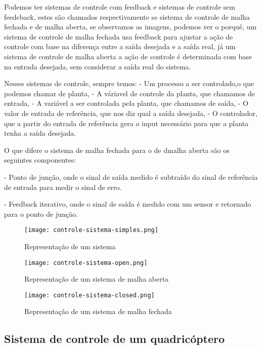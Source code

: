 Podemos ter sistemas de controle com feedback e sistemas de controle sem feedeback, estes são chamados respectivamente se sistema de controle de malha fechada e de malha aberta, se observamos as imagens, podemos ver o porquê, um sistema de controle de malha fechada usa feedback para ajustar a ação de controle com base na diferença entre a saída desejada e a saída real, já um sistema de controle de malha aberta a ação de controle é determinada com base na entrada desejada, sem considerar a saída real do sistema.

Nesses sistemas de controle, sempre temos:
- Um processo a ser controlado,o que podemos chamar de planta,
- A váriavel de controle da planta, que chamamos de entrada,
- A variável a ser controlada pela planta, que chamamos de saída,
- O valor de entrada de referência, que nos diz qual a saída desejada,
- O controlador, que a partir do entrada de referência gera o input necessário para que a planta tenha a saída desejada.

O que difere o sistema de malha fechada para o de dmalha aberta são os seguintes componentes:

- Ponto de junção, onde o sinal de saída medido é subtraído do sinal de referência de entrada para medir o sinal de erro.

- Feedback iterativo, onde o sinal de saída é medido com um sensor e retornado para o ponto de junção.



\begin{figure}[H]
	\centering
	\texttt{[image: controle-sistema-simples.png]}
	\caption{Representação de um sistema}
	\centering
	\label{Representação de um sistema}
\end{figure}

\begin{figure}[H]
	\centering
	\texttt{[image: controle-sistema-open.png]}
	\caption{Representação de um sistema de malha aberta}
	\centering
	\label{Representação de um sistema de malha aberta}
\end{figure}

\begin{figure}[H]
	\centering
	\texttt{[image: controle-sistema-closed.png]}
	\caption{Representação de um sistema de malha fechada}
	\centering
	\label{Representação de um sistema de malha fechada}
\end{figure}

\subsection*{Sistema de controle de um quadricóptero}

